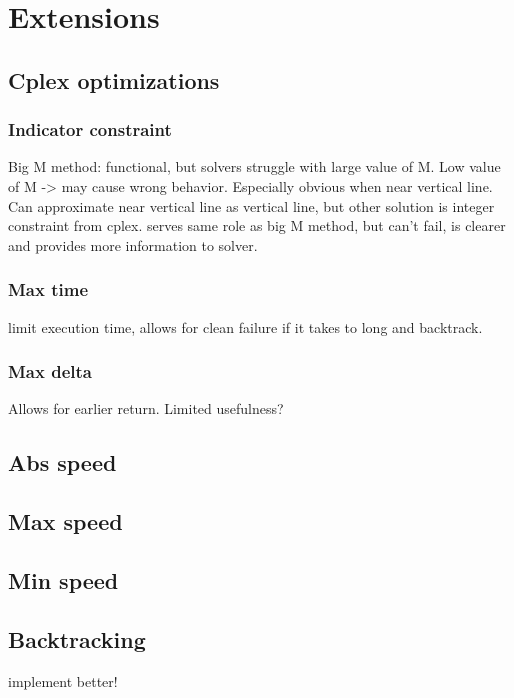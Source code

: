 \section{Extensions}
\label{section:extensions}

\subsection{Cplex optimizations}
\subsubsection{Indicator constraint}
Big M method: functional, but solvers struggle with large value of M. Low value of M -> may cause wrong behavior. Especially obvious when near vertical line. \\
Can approximate near vertical line as vertical line, but other solution is integer constraint from cplex. serves same role as big M method, but can't fail, is clearer and provides more information to solver.
\subsubsection{Max time}
limit execution time, allows for clean failure if it takes to long and backtrack.
\subsubsection{Max delta}
Allows for earlier return. Limited usefulness?

\subsection{Abs speed}


\subsection{Max speed}

\subsection{Min speed}

\subsection{Backtracking}
implement better!
